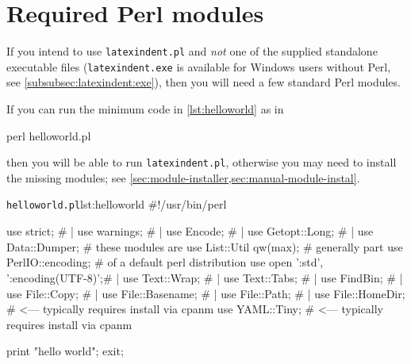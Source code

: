 \documentclass[10pt]{article}
\begin{document}
 \printbibliography[heading=subbibnumbered,title={conda-related links},keyword=conda]

 \printbibliography[heading=subbibnumbered,title={VScode-related links},keyword=vscode]

 \printbibliography[heading=subbibnumbered,title={Other links},keyword=other]

 \printbibliography[env=specialbib,heading=subbibnumbered,title={Contributors (in chronological order)\label{sec:contributors}},keyword=contributor]
\appendix
 \section{Required Perl modules}\label{sec:requiredmodules}
  If you intend to use \texttt{latexindent.pl} and \emph{not} one of the supplied
  standalone executable files (\texttt{latexindent.exe} is available for Windows users
  without Perl, see \cref{subsubsec:latexindent:exe}), then you will need a few standard
  Perl modules.

  If you can run the minimum code in \cref{lst:helloworld} as in

  \begin{commandshell}
perl helloworld.pl
  \end{commandshell}

  then you will be able to run \texttt{latexindent.pl}, otherwise you may need to install
  the missing modules; see \cref{sec:module-installer,sec:manual-module-instal}.

  \begin{cmhlistings}[style=tcblatex,language=Perl]{\texttt{helloworld.pl}}{lst:helloworld}
#!/usr/bin/perl

use strict;                         #     |
use warnings;                       #     |
use Encode;                         #     |
use Getopt::Long;                   #     |
use Data::Dumper;                   #  these modules are
use List::Util qw(max);             #  generally part
use PerlIO::encoding;               #  of a default perl distribution
use open ':std', ':encoding(UTF-8)';#     |
use Text::Wrap;                     #     |
use Text::Tabs;                     #     |
use FindBin;                        #     |
use File::Copy;                     #     |
use File::Basename;                 #     |
use File::Path;                     #     |
use File::HomeDir;                  # <--- typically requires install via cpanm
use YAML::Tiny;                     # <--- typically requires install via cpanm

print "hello world";
exit;
\end{cmhlistings}
\end{document}
